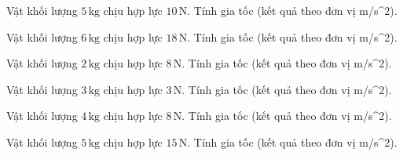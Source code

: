 \begin{ex}
Vật khối lượng $5\,\text{kg}$ chịu hợp lực $10\,\text{N}$. Tính gia tốc (kết quả theo đơn vị m/s^2).
\end{ex}

\begin{ex}
Vật khối lượng $6\,\text{kg}$ chịu hợp lực $18\,\text{N}$. Tính gia tốc (kết quả theo đơn vị m/s^2).
\end{ex}

\begin{bt}
Vật khối lượng $2\,\text{kg}$ chịu hợp lực $8\,\text{N}$. Tính gia tốc (kết quả theo đơn vị m/s^2).
\end{bt}

\begin{bt}
Vật khối lượng $3\,\text{kg}$ chịu hợp lực $3\,\text{N}$. Tính gia tốc (kết quả theo đơn vị m/s^2).
\end{bt}

\begin{bt}
Vật khối lượng $4\,\text{kg}$ chịu hợp lực $8\,\text{N}$. Tính gia tốc (kết quả theo đơn vị m/s^2).
\end{bt}

\begin{bt}
Vật khối lượng $5\,\text{kg}$ chịu hợp lực $15\,\text{N}$. Tính gia tốc (kết quả theo đơn vị m/s^2).
\end{bt}

